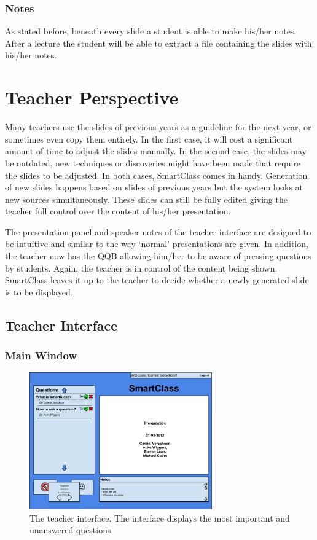 \documentclass[11pt]{article}
\begin{document}
\subsubsection{Notes}
As stated before, beneath every slide a student is able to make his/her notes. After a lecture the student will be able to extract a file containing the slides with his/her notes. 


\section{Teacher Perspective}
Many teachers use the slides of previous years as a guideline for the next year, or sometimes even copy them entirely. In the first case, it will cost a significant amount of time to adjust the slides manually. In the second case, the slides may be outdated, new techniques or discoveries might have been made that require the slides to be adjusted. In both cases, SmartClass comes in handy.  Generation of new slides happens based on slides of previous years but the system looks at new sources simultaneously. These slides can still be fully edited giving the teacher full control over the content of his/her presentation.

The presentation panel and speaker notes of the teacher interface are designed to be intuitive and similar to the way `normal' presentations are given. In addition, the teacher now has the QQB allowing him/her to be aware of pressing questions by students. Again, the teacher is in control of the content being shown. SmartClass leaves it up to the teacher to decide whether a newly generated slide is to be displayed. 

\subsection{Teacher Interface}
\subsubsection{Main Window}

\begin{figure}[!h]
\centering
\includegraphics[width=0.7\textwidth]{teacherInterface.pdf}
\caption{The teacher interface. The interface displays the most important and unanswered questions.}
\label{teacherInterface}
\end{figure}
\end{document}
